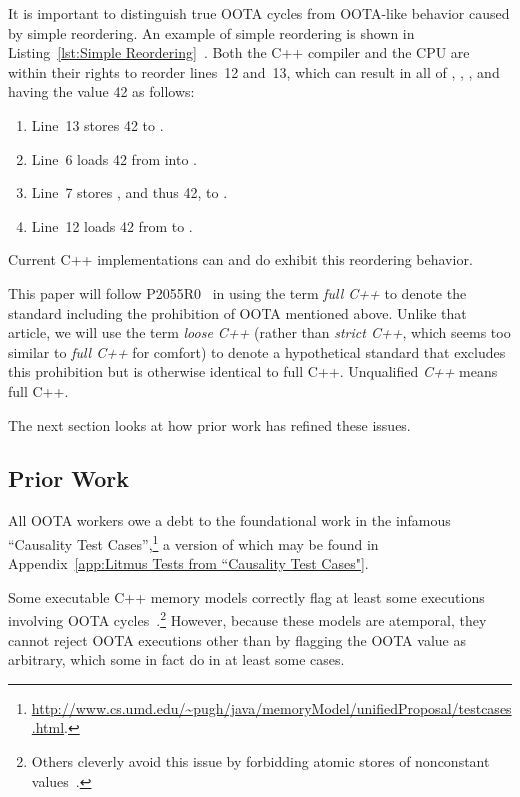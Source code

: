 \documentclass[10]{article}
\begin{document}
It is important to distinguish true OOTA cycles from OOTA-like
behavior caused by simple reordering.
An example of simple reordering is shown in
Listing~\ref{lst:Simple Reordering}~\cite{PaulEMcKenney2020RelaxedGuideRelaxed}.
Both the C++ compiler and the CPU are within their rights to reorder
lines~12 and~13, which can result in all of , , ,
and  having the value 42 as follows:
\begin{enumerate}
\item   Line~13 stores 42 to .
\item   Line~6 loads 42 from  into .
\item   Line~7 stores , and thus 42, to .
\item   Line~12 loads 42 from  to .
\end{enumerate}
Current C++ implementations can and do exhibit this reordering behavior.

\medskip

This paper will follow P2055R0~\cite{PaulEMcKenney2020RelaxedGuideRelaxed}
in using the term \emph{full C++} to denote the standard including the
prohibition of OOTA mentioned above.
Unlike that article, we will use the term \emph{loose C++}
(rather than \emph{strict C++}, which seems too similar to
\emph{full C++} for comfort)
to denote a hypothetical standard that excludes this prohibition but
is otherwise identical to full C++.
Unqualified \emph{C++} means full C++.

The next section looks at how prior work has refined these issues.

\subsection{Prior Work}
\label{sec:Prior Work}

All OOTA workers owe a debt to the foundational work in the infamous
``Causality Test Cases'',\footnote{
	\url{http://www.cs.umd.edu/~pugh/java/memoryModel/unifiedProposal/testcases.html}.}
a version of which may be found in
Appendix~\ref{app:Litmus Tests from “Causality Test Cases"}.

Some executable C++ memory models correctly flag at least some executions
involving OOTA cycles~\cite{JadeAlglave2014HerdingCats}.\footnote{
	Others cleverly avoid this issue by forbidding atomic
	stores of nonconstant values~\cite{MarkBatty2011cppmem}.}
However, because these models are atemporal, they cannot reject
OOTA executions other than by flagging the OOTA value as arbitrary,
which some in fact do in at least some cases.
\end{document}

